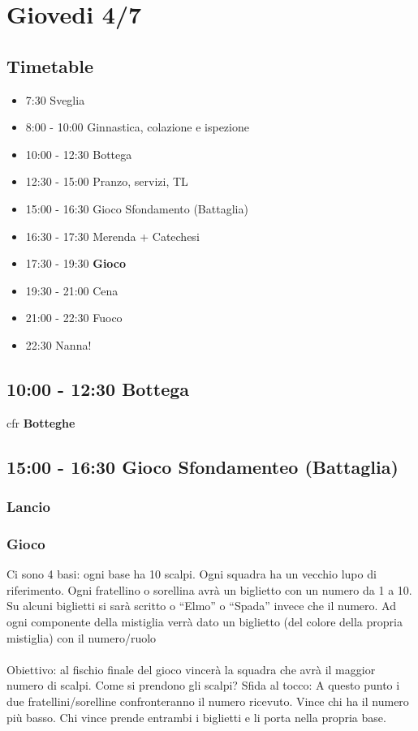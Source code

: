 \documentclass[../main.tex]{subfiles}
\begin{document}
   \section{Giovedi 4/7}
   \subsection{Timetable}
   \begin{itemize}
        \item 7:30 Sveglia
        \item 8:00 - 10:00 Ginnastica, colazione e ispezione
        \item 10:00 - 12:30 Bottega
        \item 12:30 - 15:00 Pranzo, servizi, TL
        \item 15:00 - 16:30 Gioco Sfondamento (Battaglia)
        \item 16:30 - 17:30 Merenda + Catechesi
        \item 17:30 - 19:30 \textbf{Gioco}
        \item 19:30 - 21:00 Cena
        \item 21:00 - 22:30 Fuoco
        \item 22:30 Nanna!
    \end{itemize}

   \subsection{10:00 - 12:30 Bottega}
   cfr \textbf{Botteghe}

    \subsection{15:00 - 16:30 Gioco Sfondamenteo (Battaglia)}
        \subsubsection{Lancio}
        \subsubsection{Gioco}
        Ci sono 4 basi: ogni base ha
        10 scalpi.
        Ogni squadra ha un vecchio lupo di riferimento.
        Ogni fratellino o sorellina avrà un biglietto
        con un numero da 1 a 10. Su alcuni biglietti
        si sarà scritto o “Elmo” o “Spada” invece che il numero.
        Ad ogni componente della mistiglia verrà dato un biglietto (del colore della propria mistiglia) con il numero/ruolo\\
        \\
        Obiettivo: al fischio finale del gioco vincerà la squadra che avrà il maggior numero di scalpi.
        Come si prendono gli scalpi? Sfida al tocco: A questo punto i due fratellini/sorelline confronteranno il numero ricevuto. Vince chi ha il numero più basso. Chi vince prende entrambi i biglietti e li porta nella propria base.
\end{document}
